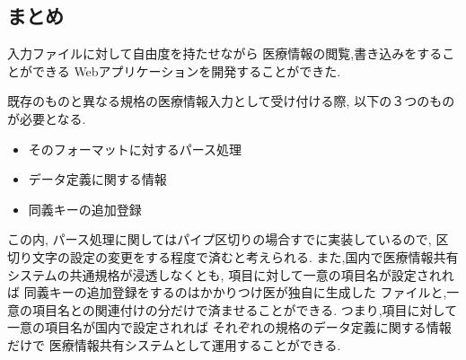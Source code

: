 \subsection{まとめ}
	入力ファイルに対して自由度を持たせながら
	医療情報の閲覧,書き込みをすることができる
	Webアプリケーションを開発することができた.

	既存のものと異なる規格の医療情報入力として受け付ける際,
	以下の３つのものが必要となる.

	\begin{itemize}
		\item そのフォーマットに対するパース処理
		\item データ定義に関する情報
		\item  同義キーの追加登録
	\end{itemize}

	この内, パース処理に関してはパイプ区切りの場合すでに実装しているので,
	区切り文字の設定の変更をする程度で済むと考えられる.
	また,国内で医療情報共有システムの共通規格が浸透しなくとも,
	項目に対して一意の項目名が設定されれば
	同義キーの追加登録をするのはかかりつけ医が独自に生成した
	ファイルと,一意の項目名との関連付けの分だけで済ませることができる.
	つまり,項目に対して一意の項目名が国内で設定されれば
	それぞれの規格のデータ定義に関する情報だけで
	医療情報共有システムとして運用することができる.
